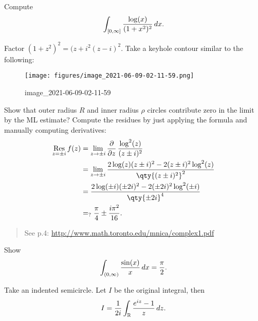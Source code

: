 \begin{exercise}

Compute
\begin{align*}
\int_{[0, \infty]} {\log(x) \over (1+x^2)^2}\,dx
.\end{align*}

\end{exercise}

\begin{solution}

Factor \((1+z^2)^2 = (z+i^2(z-i)^2\). Take a keyhole contour similar to
the following:

\begin{figure}
\centering
\texttt{[image: figures/image\_2021-06-09-02-11-59.png]}
\caption{image\_2021-06-09-02-11-59}
\end{figure}

Show that outer radius \(R\) and inner radius \(\rho\) circles
contribute zero in the limit by the ML estimate? Compute the residues by
just applying the formula and manually computing derivatives:
\begin{align*}
\mathop{\mathrm{Res}}_{z= \pm i} f(z) 
&= \lim_{z\to \pm i} {\frac{\partial }{\partial z}\,} {\log^2(z) \over (z\pm i)^2} \\
&= \lim_{z\to \pm i} {2\log(z) (z\pm i)^2 - 2(z\pm i)^2 \log^2(z) \over \qty{(z\pm i )^2}^2} \\
&= {
2\log(\pm i)(\pm 2i)^2 - 2(\pm 2i)^2 \log^2(\pm i)
\over {\qty{\pm 2i}}^4 } \\
&=_? {\pi \over 4}\pm {i\pi^2 \over 16}
.\end{align*}

\begin{quote}
See p.4: \url{http://www.math.toronto.edu/mnica/complex1.pdf}
\end{quote}

\end{solution}

\begin{exercise}

Show
\begin{align*}
\int_{(0, \infty)} {\sin(x) \over x }\,dx= {\pi \over 2}
.\end{align*}

\end{exercise}

\begin{solution}

Take an indented semicircle. Let \(I\) be the original integral, then
\begin{align*}
I = {1\over 2i} \int_{\mathbb{R}}{e^{iz} - 1 \over z } \,dz
.\end{align*}

\end{solution}

